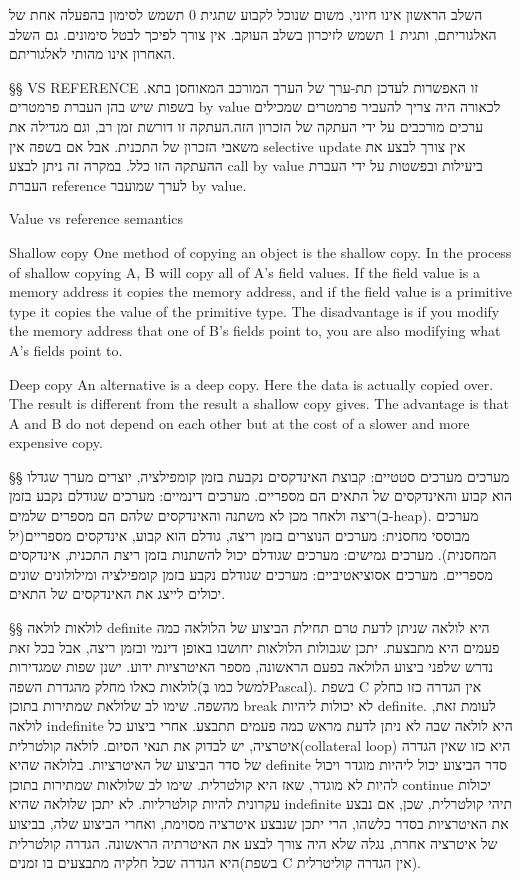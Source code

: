         השלב הראשון אינו חיוני, משום שנוכל לקבוע שתגית 0 תשמש לסימון בהפעלה אחת של האלגוריתם, ותגית 1 תשמש לזיכרון בשלב העוקב. אין צורך לפיכך לבטל סימונים. גם השלב האחרון אינו מהותי לאלגוריתם.

        §§ VS REFERENCE
        זו האפשרות לעדכן תת-ערך של הערך המורכב המאוחסן בתא.
        בשפות שיש בהן העברת פרמטרים by value לכאורה היה צריך להעביר פרמטרים שמכילים ערכים מורכבים על ידי העתקה של הזכרון הזה.העתקה זו דורשת זמן רב, וגם מגדילה את משאבי הזכרון של התכנית.
        אבל אם בשפה אין selective update אין צורך לבצע את ההעתקה הזו כלל. במקרה זה ניתן לבצע call by value ביעילות ובפשטות על ידי העברת העברת reference לערך שמועבר by value.

        Value vs reference semantics

        Shallow copy
        One method of copying an object is the shallow copy. In the process of shallow copying A, B will copy all of A's field values. If the field value is a memory address it copies the memory address, and if the field value is a primitive type it copies the value of the primitive type.
        The disadvantage is if you modify the memory address that one of B's fields point to, you are also modifying what A's fields point to.

        Deep copy
        An alternative is a deep copy. Here the data is actually copied over. The result is different from the result a shallow copy gives. The advantage is that A and B do not depend on each other but at the cost of a slower and more expensive copy.

        §§ מערכים
        מערכים סטטיים:
        קבוצת האינדקסים נקבעת בזמן קומפילציה, יוצרים מערך שגדלו הוא קבוע והאינדקסים של התאים הם מספריים.
        מערכים דינמיים:
        מערכים שגודלם נקבע בזמן ריצה ולאחר מכן לא משתנה והאינדקסים שלהם הם מספרים שלמים(ב-heap).
        מערכים מבוססי מחסנית:
        מערכים הנוצרים בזמן ריצה, גודלם הוא קבוע, אינדקסים מספריים(יל המחסנית).
        מערכים גמישים:
        מערכים שגודלם יכול להשתנות בזמן ריצת התכנית, אינדקסים מספריים.
        מערכים אסוציאטיביים:
        מערכים שגודלם נקבע בזמן קומפילציה ומילולונים שונים יכולים לייצג את האינדקסים של התאים.

        §§ לולאות
        לולאה definite היא לולאה שניתן לדעת טרם תחילת הביצוע של הלולאה כמה פעמים היא מתבצעת. יתכן שגבולות הלולאות יחושבו באופן דינמי ובזמן ריצה, אבל בכל זאת נדרש שלפני ביצוע הלולאה בפעם הראשונה, מספר האיטרציות ידוע. ישנן שפות שמגדירות לולאות כאלו מחלק מהגדרת השפה(למשל כמו בְּPascal).
        בשפת C אין הגדרה כזו כחלק מהשפה. שימו לב שלולאת שמתירות בתוכן break לא יכולות ליהיות definite.
        לעומת זאת, לולאה indefinite היא לולאה שבה לא ניתן לדעת מראש כמה פעמים תתבצע. אחרי ביצוע כל איטרציה, יש לבדוק את תנאי הסיום.
        לולאה קולטרלית(collateral loop) היא כזו שאין הגדרה של סדר הביצוע של האיטרציות. בלולאה שהיא definite סדר הביצוע יכול ליהיות מוגדר ויכול להיות לא מוגדר, שאז היא קולטרלית. שימו לב שלולאות שמתירות בתוכן continue יכולות עקרונית להיות קולטרליות. לא יתכן שלולאה שהיא indefinite תיהי קולטרלית, שכן, אם נבצע את האיטרציות בסדר כלשהו, הרי יתכן שנבצע איטרציה מסוימת, ואחרי הביצוע שלה, בביצוע של איטרציה אחרת, נגלה שלא היה צורך לבצע את האיטרתיה הראשונה.
        הגדרה קולטרלית היא הגדרה שכל חלקיה מתבצעים בו זמנים(בשפת C אין הגדרה קוליטרלית).

